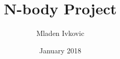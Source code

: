 




\title{N-body Project}


\author[M. Ivkovic]{Mladen Ivkovic}
\date{January 2018}











% 
% 
% 
% 
% 







